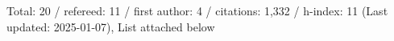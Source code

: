 Total: 20 / refereed: 11 / first author: 4 / citations: 1,332 / h-index: 11 (Last updated: 2025-01-07), List attached below